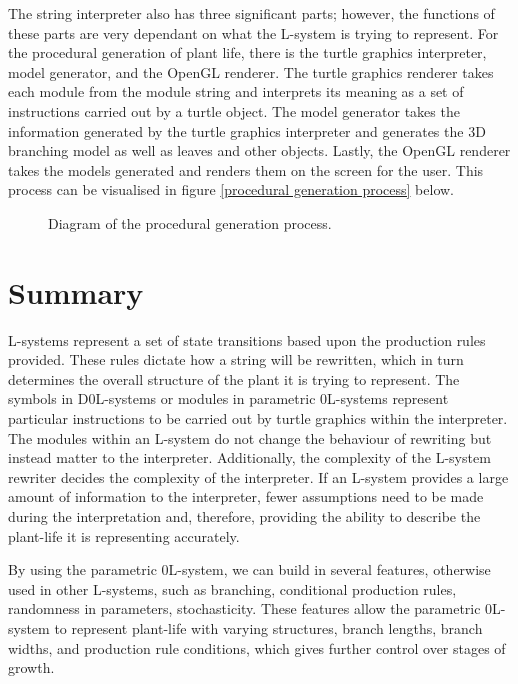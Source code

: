 The string interpreter also has three significant parts; however, the functions of these parts are very dependant on what the L-system is trying to represent. For the procedural generation of plant life, there is the turtle graphics interpreter, model generator, and the OpenGL renderer. The turtle graphics renderer takes each module from the module string and interprets its meaning as a set of instructions carried out by a turtle object. The model generator takes the information generated by the turtle graphics interpreter and generates the 3D branching model as well as leaves and other objects. Lastly, the OpenGL renderer takes the models generated and renders them on the screen for the user. This process can be visualised in figure \ref{procedural generation process} below.

\begin{figure}[htbp]
	{\centering
		\setlength{\fboxrule}{1pt}
		\vspace{7px}
		\caption{Diagram of the procedural generation process.}
	}
\end{figure}
\FloatBarrier

\section{Summary}

L-systems represent a set of state transitions based upon the production rules provided. These rules dictate how a string will be rewritten, which in turn determines the overall structure of the plant it is trying to represent. The symbols in D0L-systems or modules in parametric 0L-systems represent particular instructions to be carried out by turtle graphics within the interpreter. The modules within an L-system do not change the behaviour of rewriting but instead matter to the interpreter. Additionally, the complexity of the L-system rewriter decides the complexity of the interpreter. If an L-system provides a large amount of information to the interpreter, fewer assumptions need to be made during the interpretation and, therefore, providing the ability to describe the plant-life it is representing accurately.

By using the parametric 0L-system, we can build in several features, otherwise used in other L-systems, such as branching, conditional production rules, randomness in parameters, stochasticity. These features allow the parametric 0L-system to represent plant-life with varying structures, branch lengths, branch widths, and production rule conditions, which gives further control over stages of growth.

